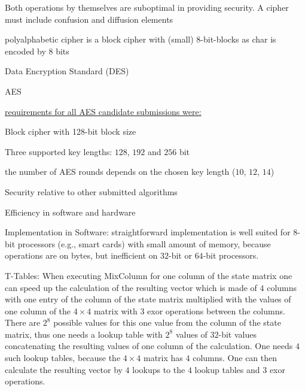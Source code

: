 \documentclass[landscape, a4paper]{article}
\begin{document}
\begin{minipage}[t]{0.198\pagewidth}
\begin{betterlist}
\begin{betterlist}
\begin{betterlist}
\begin{betterlist}
					\item Both operations by themselves are suboptimal in providing security. A cipher must include confusion and diffusion elements
				\end{betterlist}
			\end{betterlist}
			\item \alert{polyalphabetic cipher} is a block cipher with (small) $8$-bit-blocks as char is encoded by $8$ bits
			\item Data Encryption Standard (\alert{DES})
			\item \alert{AES}
		\end{betterlist}
	\end{betterlist}
\end{minipage}
\begin{minipage}[t]{0.198\pagewidth}
	\begin{betterlist}
		\item \underline{requirements for all AES candidate submissions were:}
		\begin{betterlist}
			\item Block cipher with 128-bit block size
			\item Three supported key lengths: $128$, $192$ and $256$ bit
			\begin{betterlist}
				\item the number of AES rounds depends on the chosen key length ($10$, $12$, $14$)
			\end{betterlist}
			\item Security relative to other submitted algorithms
			\item Efficiency in software and hardware
			\begin{betterlist}
				\item \alert{Implementation in Software:} straightforward implementation is well suited for $8$-bit processors (e.g., smart cards) with small amount of memory, because operations are on bytes, but inefficient on $32$-bit or $64$-bit processors.
				\item \alert{T-Tables:} When executing MixColumn for one column of the state matrix one can speed up the calculation of the resulting vector which is made of $4$ \alert{columns} with one entry of the column of the state matrix multiplied with the values of one column of the $4\times 4$ matrix with $3$ exor operations between the columns. There are $2^8$ possible values for this one value from the column of the state matrix, thus one needs a lookup table with $2^8$ values of $32$-bit values concatenating the resulting values of one column of the calculation. One needs $4$ such lookup tables, because the $4\times 4$ matrix has $4$ columns. One can then calculate the resulting vector by $4$ lookups to the $4$ lookup tables and $3$ exor operations.

\end{betterlist}
\end{betterlist}
\end{betterlist}
\end{minipage}
\end{document}
